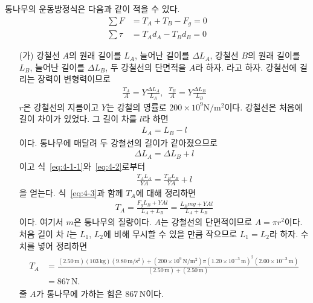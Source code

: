 \documentclass[floatfix,nofootinbib,superscriptaddress,fleqn]{revtex4-2}
\begin{document}
통나무의 운동방정식은 다음과 같이 적을 수 있다.
\begin{align}
  \label{eq:4-1-1}\sum F    &= T_A + T_B - F_g   = 0 \\
  \label{eq:4-1-2}\sum \tau &= T_A d_A - T_B d_B = 0
\end{align}
\begin{itemize}
  \item[(가)] 
  강철선 $A$의 원래 길이를 $L_A$, 늘어난 길이를 $\Delta L_A$, 
  강철선 $B$의 원래 길이를 $L_B$, 늘어난 길이를 $\Delta L_B$, 
  두 강철선의 단면적을 $A$라 하자.
  라고 하자. 강철선에 걸리는 장력이 변형력이므로
  \begin{align}  \label{eq:4-2}
    \frac{T_A }{A} = Y\frac{\Delta L_A}{L_A},\,\,\,
    \frac{T_B }{A} = Y\frac{\Delta L_B}{L_B}
  \end{align}
  $r$은 강철선의 지름이고
  $Y$는 강철의 영률로 $200\times 10^9\mathrm{N/m^2}$이다.
  강철선은 처음에 길이 차이가 있었다. 그 길이 차를 $l$라 하면
  \begin{align}\label{eq:4-3}
    L_A = L_B - l
  \end{align}  
  이다. 통나무에 매달려 두 강철선의 길이가 같아졌으므로 
  \begin{align}
    \Delta L_A= \Delta L_B + l
  \end{align}
  이고 식~\eqref{eq:4-1-1}와~\eqref{eq:4-2}로부터
  \begin{align}
    \frac{ T_AL_A }{YA } = \frac{T_B L_B }{Y A} + l
  \end{align}
  을 얻는다. 식~\eqref{eq:4-3}과 함께 $T_A$에 대해 정리하면
  \begin{align}
    T_A =  \frac{F_gL_B + YAl}{L_A+L_B}
    =\frac{L_Bmg + YAl}{L_A+L_B}
  \end{align}
  이다. 여기서 $m$은 통나무의 질량이다. 
   $A$는 강철선의 단면적이므로 $A = \pi r^2$이다.
  처음 길이 차 $l$는 $L_1$, $L_2$에 비해
  무시할 수 있을 만큼 작으므로 $L_1=L_2$라 하자. 수치를 넣어 정리하면
  \begin{align}
    \begin{split}
      T_A 
      &=\frac{(2.50\,\mathrm{m})(103\,\mathrm{kg})
      (9.80\,\mathrm{m/s^2})  
      + (200\times 10^9\,\mathrm{N/m^2})
      \pi(1.20\times 10^{-3}\,\mathrm{m})^2
      (2.00\times 10^{-3}\,\mathrm{m})}
      {(2.50\,\mathrm{m})+(2.50\,\mathrm{m})} \\
      &=867\,\mathrm{N}.
    \end{split}
  \end{align}
  줄 $A$가 통나무에 가하는 힘은 $867\,\mathrm{N}$이다.

\end{itemize}
\end{document}

